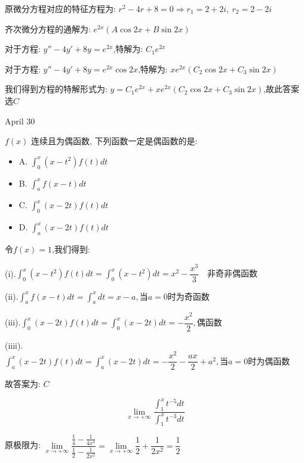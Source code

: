 \begin{solution}
	
	原微分方程对应的特征方程为: $r^2-4r+8=0\Rightarrow r_{1}=2+2i,\ r_{2}=2-2i$
	
	齐次微分方程的通解为: $e^{2x}(A\cos 2x+B\sin 2x)$
	
	对于方程: $y''-4y'+8y=e^{2x}$,特解为: $C_{1}e^{2x}$
	
	对于方程: $y''-4y'+8y=e^{2x}\cos 2x$,特解为: $xe^{2x}(C_{2}\cos 2x+C_{3}\sin 2x)$
	
	我们得到方程的特解形式为: $y=C_{1}e^{2x}+xe^{2x}(C_{2}\cos 2x+C_{3}\sin 2x)$,故此答案选$C$
\end{solution}


\textcolor{purplea}{April 30}

\begin{example}[][Exam: 30.4.17]
	$f(x)$ 连续且为偶函数, 下列函数一定是偶函数的是: 
\begin{itemize}
	\item A. $\int_{0}^{x}(x-t^2)f(t)dt$ 
	\item B. $\int_{a}^{x}f(x-t)dt$ 
	\item C. $\int_{0}^{x}(x-2t)f(t)dt$ 
	\item D. $\int_{a}^{x}(x-2t)f(t)dt$ 
\end{itemize}
\end{example}

\begin{solution}
	
	令$f(x)=1$,我们得到: 
	
	(i).$\int_{0}^{x}(x-t^2)f(t)dt=\int_{0}^{x}(x-t^2)dt=x^2-\dfrac{x^3}{3}\quad \text{非奇非偶函数}$
	
	(ii).$\int_{a}^{x}f(x-t)dt=\int_{a}^{x}dt=x-a,\text{当}a=0\text{时为奇函数}$
	
	(iii).$\int_{0}^{x}(x-2t)f(t)dt=\int_{0}^{x}(x-2t)dt=-\dfrac{x^2}{2},\text{偶函数}$
	
	(iiii). $\int_{a}^{x}(x-2t)f(t)dt=\int_{a}^{x}(x-2t)dt=-\dfrac{x^2}{2}-\dfrac{ax}{2}+a^2,\text{当}a=0\text{时为偶函数}$
	
	故答案为: $C$
\end{solution}

\begin{example}[][Exam: 30.4.18]
	$$\lim\limits_{x\to +\infty}\dfrac{\int_{1}^{x}t^{-5}dt}{\int_{1}^{x}t^{-3}dt}$$
\end{example}

\begin{solution}
	
	原极限为: $\lim\limits_{x\to +\infty}\dfrac{\frac{1}{4}-\frac{1}{4x^4}}{\frac{1}{2}-\frac{1}{2x^2}}=\lim\limits_{x\to +\infty}\dfrac{1}{2}+\dfrac{1}{2x^2}=\dfrac{1}{2}$
\end{solution}